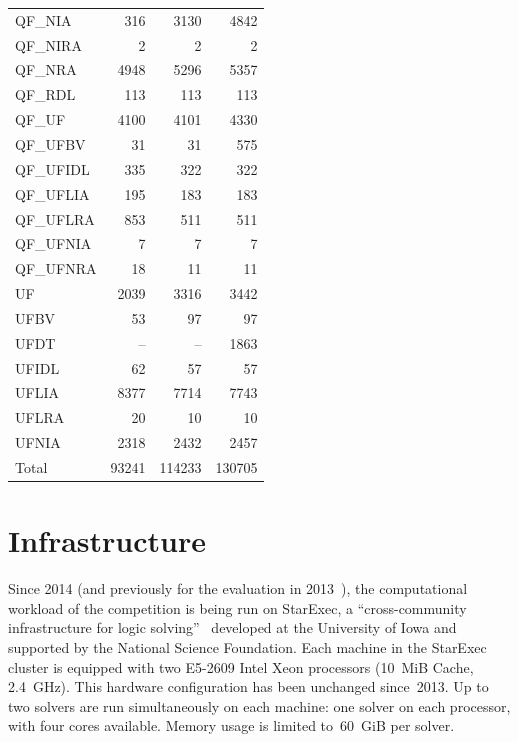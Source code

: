 \documentclass[dvipsnames,table,twoside,11pt]{article}
\begin{document}
\begin{table}
{\begin{tabular}{lrrr}
    QF\_NIA    &    316 &   3130 &   4842 \\
    QF\_NIRA   &      2 &      2 &      2 \\
    QF\_NRA    &   4948 &   5296 &   5357 \\
    QF\_RDL    &    113 &    113 &    113 \\
    QF\_UF     &   4100 &   4101 &   4330 \\
    QF\_UFBV   &     31 &     31 &    575 \\
    QF\_UFIDL  &    335 &    322 &    322 \\
    QF\_UFLIA  &    195 &    183 &    183 \\
    QF\_UFLRA  &    853 &    511 &    511 \\
    QF\_UFNIA  &      7 &      7 &      7 \\
    QF\_UFNRA  &     18 &     11 &     11 \\
    UF         &   2039 &   3316 &   3442 \\
    UFBV       &     53 &     97 &     97 \\
    UFDT       &     -- &     -- &   1863 \\
    UFIDL      &     62 &     57 &     57 \\
    UFLIA      &   8377 &   7714 &   7743 \\
    UFLRA      &     20 &     10 &     10 \\
    UFNIA      &   2318 &   2432 &   2457 \\
    \midrule
    Total      &  93241 & 114233 & 130705 \\
    \bottomrule
  \end{tabular}}
\end{table}


\section{Infrastructure}
\label{sec:starexec}

Since 2014 (and previously for the evaluation in 2013~\cite{CSW15}),
the computational workload of the competition is being run on
StarExec, a ``cross-community infrastructure for logic
solving''~\cite{DBLP:conf/cade/StumpST14} developed at the University
of Iowa and supported by the National Science Foundation.  Each
machine in the StarExec cluster is equipped with two E5-2609 Intel
Xeon processors (10~MiB Cache, 2.4~GHz).  This hardware configuration
has been unchanged since~2013.  Up to two solvers are run
simultaneously on each machine: one solver on each processor, with
four cores available.  Memory usage is limited to~60~GiB per solver.
\end{document}
